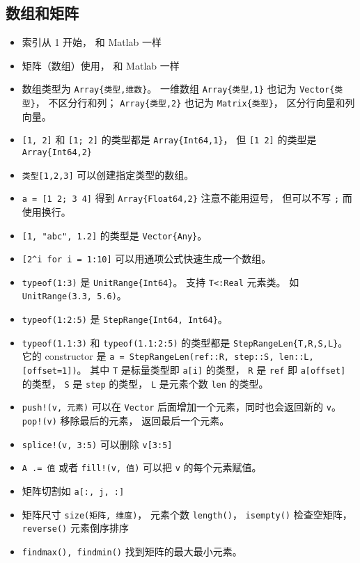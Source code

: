 \subsection{数组和矩阵}
\begin{itemize}
\item 索引从 1 开始， 和 Matlab 一样
\item 矩阵（数组）使用， 和 Matlab 一样
\item 数组类型为 \verb`Array{类型,维数}`。 一维数组 \verb`Array{类型,1}` 也记为 \verb`Vector{类型}`， 不区分行和列； \verb`Array{类型,2}` 也记为 \verb`Matrix{类型}`， 区分行向量和列向量。
\item \verb`[1, 2]` 和 \verb`[1; 2]` 的类型都是 \verb`Array{Int64,1}`， 但 \verb`[1 2]` 的类型是 \verb`Array{Int64,2}`
\item \verb`类型[1,2,3]` 可以创建指定类型的数组。
\item \verb`a = [1 2; 3 4]` 得到 \verb`Array{Float64,2}` 注意不能用逗号， 但可以不写 \verb`;` 而使用换行。
\item \verb`[1, "abc", 1.2]` 的类型是 \verb`Vector{Any}`。
\item \verb`[2^i for i = 1:10]` 可以用通项公式快速生成一个数组。
\item \verb`typeof(1:3)` 是 \verb`UnitRange{Int64}`。 支持 \verb`T<:Real` 元素类。 如 \verb`UnitRange(3.3, 5.6)`。
\item \verb`typeof(1:2:5)` 是 \verb`StepRange{Int64, Int64}`。
\item \verb`typeof(1.1:3)` 和 \verb`typeof(1.1:2:5)` 的类型都是 \verb`StepRangeLen{T,R,S,L}`。 它的 constructor 是 \verb`a = StepRangeLen(ref::R, step::S, len::L, [offset=1])`。 其中 \verb`T` 是标量类型即 \verb`a[i]` 的类型， \verb`R` 是 \verb`ref` 即 \verb`a[offset]` 的类型， \verb`S` 是 \verb`step` 的类型， \verb`L` 是元素个数 \verb`len` 的类型。
\item \verb`push!(v, 元素)` 可以在 \verb`Vector` 后面增加一个元素，同时也会返回新的 \verb`v`。 \verb`pop!(v)` 移除最后的元素， 返回最后一个元素。
\item \verb`splice!(v, 3:5)` 可以删除 \verb`v[3:5]`
\item \verb`A .= 值` 或者 \verb`fill!(v, 值)` 可以把 \verb`v` 的每个元素赋值。
\item 矩阵切割如 \verb`a[:, j, :]`
\item 矩阵尺寸 \verb`size(矩阵, 维度)`， 元素个数 \verb`length()`， \verb`isempty()` 检查空矩阵， \verb`reverse()` 元素倒序排序
\item \verb`findmax(), findmin()` 找到矩阵的最大最小元素。

\end{itemize}
